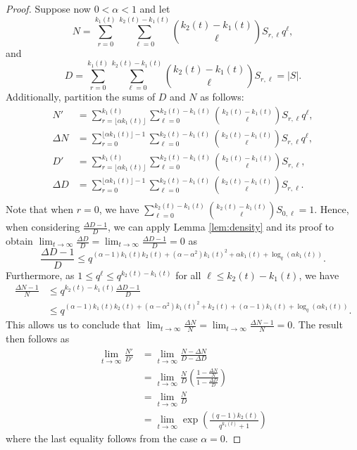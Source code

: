 \documentclass[a4paper,11pt,reqno]{article}
\theoremstyle{plain} \numberwithin{equation}{section}
\theoremstyle{definition}
\begin{document}
\begin{proof}
Suppose now $0<\alpha <1$ and let $$N = \sum_{r=0}^{k_1(t)} \sum_{\ell=0}^{k_2(t)-k_1(t)} \binom{k_2(t)-k_1(t)}{\ell}S_{r,\ell}q^{\ell},$$ and $$D =\sum_{r=0}^{k_1(t)} \sum_{\ell=0}^{k_2(t)-k_1(t)} \binom{k_2(t)-k_1(t)}{\ell}S_{r,\ell} = |S|.$$ Additionally, partition the sums of $D$ and $N$ as follows:
\begin{align*}
    N' &= \sum_{r=\lfloor\alpha k_1(t)\rfloor}^{k_1(t)} \sum_{\ell=0}^{k_2(t)-k_1(t)} \binom{k_2(t)-k_1(t)}{\ell}S_{r,\ell}q^{\ell},\\
    \Delta N &= \sum_{r=0}^{\lfloor \alpha k_1(t) \rfloor -1} \sum_{\ell=0}^{k_2(t)-k_1(t)} \binom{k_2(t)-k_1(t)}{\ell}S_{r,\ell}q^{\ell}, \\
    D' &= \sum_{r=\lfloor \alpha k_1(t) \rfloor}^{k_1(t)} \sum_{\ell=0}^{k_2(t)-k_1(t)} \binom{k_2(t)-k_1(t)}{\ell}S_{r,\ell},\\
    \Delta D &= \sum_{r=0}^{\lfloor \alpha k_1(t) \rfloor -1} \sum_{\ell=0}^{k_2(t)-k_1(t)} \binom{k_2(t)-k_1(t)}{\ell}S_{r,\ell}. \\
\end{align*}
Note that when $r=0$, we have $\sum_{\ell=0}^{k_2(t)-k_1(t)} \binom{k_2(t)-k_1(t)}{\ell}S_{0,\ell} =1$. Hence, when considering  $\frac{\Delta D -1}{D}$, we can apply Lemma \ref{lem:density} and its proof to obtain  $\lim_{t \rightarrow \infty} \frac{\Delta D}{D} = \lim_{t \rightarrow \infty} \frac{\Delta D - 1}{D} =  0$ as 
\[
    \frac{\Delta D -1}{D} \leq q^{(\alpha-1) k_1(t) k_2(t) + (\alpha-\alpha^2) k_1(t)^2 + \alpha k_1(t) + \log_q(\alpha k_1(t))}.
\]
Furthermore, as $1\leq q^\ell \leq q^{k_2(t)-k_1(t)}$ for all $\ell \leq k_2(t)-k_1(t)$, we have
\begin{align*}
    \frac{\Delta N - 1}{N} &\leq q^{k_2(t)-k_1(t)} \frac{\Delta D -1}{D} \\
    &\leq q^{(\alpha-1) k_1(t) k_2(t) + (\alpha-\alpha^2) k_1(t)^2 + k_2(t) + (\alpha -1)k_1(t) + \log_q(\alpha k_1(t))}.
\end{align*}
This allows us to conclude that $\lim_{t\rightarrow \infty} \frac{\Delta N}{N} = \lim_{t\rightarrow \infty} \frac{\Delta N -1 }{N} = 0$. The result then follows as
\begin{align*}
   \lim_{t\rightarrow \infty} \frac{N'}{D'} &= \lim_{t\rightarrow \infty}\frac{N-\Delta N}{D- \Delta D}\\
   &= \lim_{t\rightarrow \infty} \frac{N}{D} \left(\frac{1- \frac{\Delta N}{N}}{1- \frac{\Delta D}{D}} \right)  \\
   &= \lim_{t\rightarrow \infty} \frac{N}{D}\\ 
     &= \lim_{t\rightarrow \infty} \exp \left( \frac{(q-1)k_2(t)}{q^{k_1(t)}+1}\right)
  \end{align*}
where the last equality follows from the case $\alpha = 0$. 
\end{proof}
\end{document}
